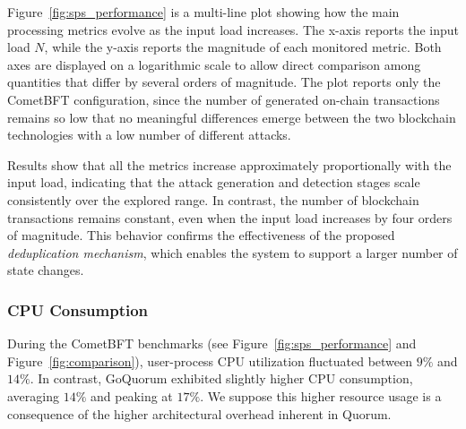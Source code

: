 Figure~\ref{fig:sps_performance} is a multi-line plot showing how the main processing metrics evolve as the input load increases. The x-axis reports the input load $N$, while the y-axis reports the magnitude of each monitored metric. Both axes are displayed on a logarithmic scale to allow direct comparison among quantities that differ by several orders of magnitude. The plot reports only the CometBFT configuration, since the number of generated on-chain transactions remains so low that no meaningful differences emerge between the two blockchain technologies with a low number of different attacks.


Results show that all the metrics increase approximately proportionally with the input load, indicating that the attack generation and detection stages scale consistently over the explored range. In contrast, the number of blockchain transactions remains constant, even when the input load increases by four orders of magnitude. This behavior confirms the effectiveness of the proposed \textit{deduplication mechanism}, which enables the system to support a larger number of state changes. 

\subsubsection{CPU Consumption}
During the CometBFT benchmarks (see Figure~\ref{fig:sps_performance} and Figure~\ref{fig:comparison}), user-process CPU utilization fluctuated between $9\%$ and $14\%$. In contrast, GoQuorum exhibited slightly higher CPU consumption, averaging $14\%$ and peaking at $17\%$. We suppose this higher resource usage is a consequence of the higher architectural overhead inherent in Quorum. 